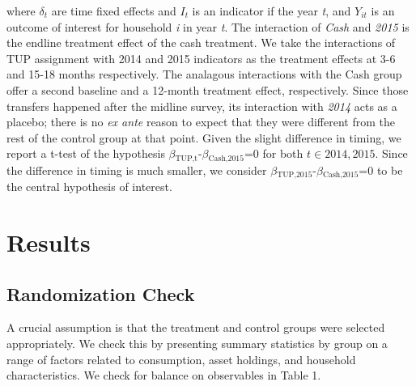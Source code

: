 \documentclass[12pt,article]{article}
\begin{document}
where $\delta_{t}$ are time fixed effects and $I_{t}$ is an indicator if the year
\emph{t}, and $Y_{it}$ is an outcome of interest for household \emph{i} in year \emph{t}. The
interaction of \emph{Cash} and \emph{2015} is the endline treatment effect of the cash
treatment. We take the interactions of TUP assignment with 2014 and 2015 indicators
as the treatment effects at 3-6 and 15-18 months respectively. The analagous
interactions with the Cash group offer a second baseline and a 12-month treatment
effect, respectively. Since those transfers happened after the midline survey, its
interaction with \emph{2014} acts as a placebo; there is no \emph{ex ante} reason to expect
that they were different from the rest of the control group at that point.
Given the slight difference in timing, we report a t-test of the hypothesis
$\beta$$_{\text{TUP,t}}$-$\beta$$_{\text{Cash,2015}}$=0 for both $t \in {2014,2015}$. Since the difference
in timing is much smaller, we consider $\beta$$_{\text{TUP,2015}}$-$\beta$$_{\text{Cash,2015}}$=0 to be the
central hypothesis of interest.

\section{Results}
\label{sec-3}
\subsection{Randomization Check}
\label{sec-3-1}

A crucial assumption is that the treatment and control groups were selected
appropriately. We check this by presenting summary statistics by group on a
range of factors related to consumption, asset holdings, and household
characteristics. We check for balance on observables in Table 1.
\end{document}
